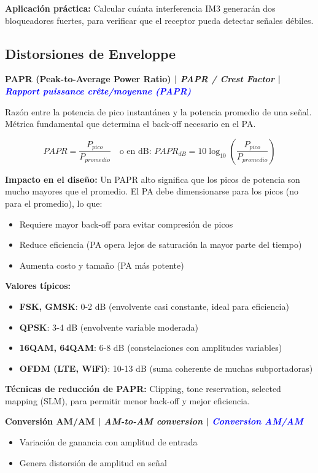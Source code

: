 \documentclass[a4paper,10pt]{article}
\begin{document}
\textbf{Aplicaci\'on pr\'actica:} Calcular cu\'anta interferencia IM3 generar\'an dos bloqueadores fuertes, para verificar que el receptor pueda detectar se\~nales d\'ebiles.

\subsection{Distorsiones de Enveloppe}

\textbf{PAPR (Peak-to-Average Power Ratio) | \textit{PAPR / Crest Factor} | \textcolor{blue}{\textit{Rapport puissance cr\^ete/moyenne (PAPR)}}}

Raz\'on entre la potencia de pico instant\'anea y la potencia promedio de una se\~nal. M\'etrica fundamental que determina el back-off necesario en el PA.

$$PAPR = \frac{P_{pico}}{P_{promedio}} \quad \text{o en dB: } PAPR_{dB} = 10\log_{10}\left(\frac{P_{pico}}{P_{promedio}}\right)$$

\textbf{Impacto en el dise\~no:} Un PAPR alto significa que los picos de potencia son mucho mayores que el promedio. El PA debe dimensionarse para los picos (no para el promedio), lo que:
\begin{itemize}[leftmargin=*]
    \item Requiere mayor back-off para evitar compresi\'on de picos
    \item Reduce eficiencia (PA opera lejos de saturaci\'on la mayor parte del tiempo)
    \item Aumenta costo y tama\~no (PA m\'as potente)
\end{itemize}

\textbf{Valores t\'ipicos:}
\begin{itemize}[leftmargin=*]
    \item \textbf{FSK, GMSK}: 0-2 dB (envolvente casi constante, ideal para eficiencia)
    \item \textbf{QPSK}: 3-4 dB (envolvente variable moderada)
    \item \textbf{16QAM, 64QAM}: 6-8 dB (constelaciones con amplitudes variables)
    \item \textbf{OFDM (LTE, WiFi)}: 10-13 dB (suma coherente de muchas subportadoras)
\end{itemize}

\textbf{T\'ecnicas de reducci\'on de PAPR:} Clipping, tone reservation, selected mapping (SLM), para permitir menor back-off y mejor eficiencia.

\textbf{Conversión AM/AM | \textit{AM-to-AM conversion} | \textcolor{blue}{\textit{Conversion AM/AM}}}
\begin{itemize}[leftmargin=*]
    \item Variación de ganancia con amplitud de entrada
    \item Genera distorsi\'on de amplitud en se\~nal
\end{itemize}
\end{document}
